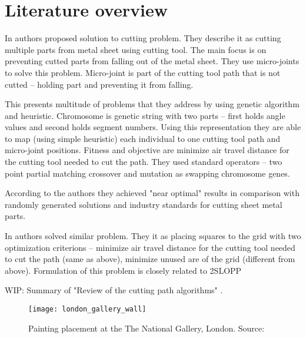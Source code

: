 \chapter{Literature overview}\label{ch:literature-overview}

In \cite{kandasamyEffectiveLocationMicro2020} authors proposed solution to cutting problem.
They describe it as cutting multiple parts from metal sheet using cutting tool.
The main focus is on preventing cutted parts from falling out of the metal sheet.
They use micro-joints to solve this problem. Micro-joint is part of the cutting tool
path that is not cutted – holding part and preventing it from falling.

This presents multitude of problems that they address by using genetic algorithm
and heuristic. Chromosome is genetic string with two parts – first holds
angle values and second holds segment numbers. Using this representation they are able
to map (using simple heuristic) each individual to one cutting tool path and micro-joint positions.
Fitness and objective are minimize air travel distance for the cutting tool needed to cut the
path. They used standard operators – two point partial matching crossover and mutation
as swapping chromosome genes.

According to the authors they achieved "near optimal" results in comparison with randomly
generated solutions and industry standards for cutting sheet metal parts.

In \cite{vijayanandHeuristicGeneticApproach2015} authors solved similar problem. They it
as placing squares to the grid with two optimization criterions – minimize air travel distance
for the cutting tool needed to cut the path (same as above), minimize unused are of the grid (different from above).
Formulation of this problem is closely related to 2SLOPP\footnotemark

WIP: Summary of "Review of the cutting path algorithms" \cite{dewilReviewCuttingPath2016}.


\begin{figure}[htp]
    \texttt{[image: london\_gallery\_wall]}
    \caption{Painting placement at the The National Gallery, London. Source:~\cite{ScreenshotWallGoogle}}
    \label{fig:london-wall}
\end{figure}


